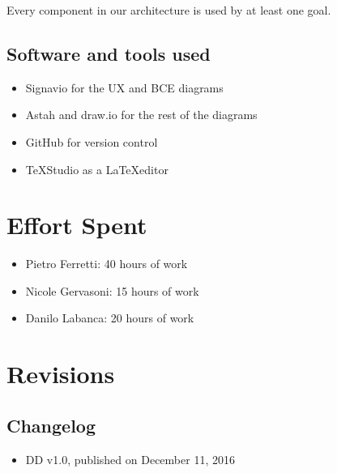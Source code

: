 \documentclass[english]{article}
\begin{document}
Every component in our architecture is used by at least one goal.

\newpage

\subsection{Software and tools used}
\begin{itemize}
	\item{Signavio for the UX and BCE diagrams}
	\item{Astah and draw.io for the rest of the diagrams}
	\item{GitHub for version control}
	\item{\TeX Studio as a \LaTeX editor}
	
\end{itemize}

\section{Effort Spent}
\begin{itemize}
	\item{Pietro Ferretti: 40 hours of work}
	\item{Nicole Gervasoni: 15 hours of work}
	\item{Danilo Labanca: 20 hours of work}
\end{itemize}


\section{Revisions}

\subsection{Changelog}
\begin{itemize}
	\item{DD v1.0, published on December 11, 2016}
\end{itemize}
\end{document}
